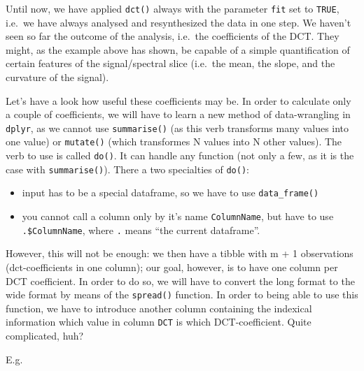 \documentclass[]{book}
\newenvironment{Shaded}{\begin{snugshade}}{\end{snugshade}}
\newcommand{\CommentTok}[1]{\textcolor[rgb]{0.56,0.35,0.01}{\textit{#1}}}
\newcommand{\DataTypeTok}[1]{\textcolor[rgb]{0.13,0.29,0.53}{#1}}
\newcommand{\DecValTok}[1]{\textcolor[rgb]{0.00,0.00,0.81}{#1}}
\newcommand{\KeywordTok}[1]{\textcolor[rgb]{0.13,0.29,0.53}{\textbf{#1}}}
\newcommand{\NormalTok}[1]{#1}
\newcommand{\OperatorTok}[1]{\textcolor[rgb]{0.81,0.36,0.00}{\textbf{#1}}}
\newcommand{\StringTok}[1]{\textcolor[rgb]{0.31,0.60,0.02}{#1}}
\providecommand{\tightlist}{%
  \setlength{\itemsep}{0pt}\setlength{\parskip}{0pt}}
\begin{document}
Until now, we have applied \texttt{dct()} always with the parameter \texttt{fit} set to \texttt{TRUE}, i.e.~we have always analysed and resynthesized the data in one step. We haven't seen so far the outcome of the analysis, i.e.~the coefficients of the DCT. They might, as the example above has shown, be capable of a simple quantification of certain features of the signal/spectral slice (i.e.~the mean, the slope, and the curvature of the signal).

Let's have a look how useful these coefficients may be. In order to calculate only a couple of coefficients, we will have to learn a new method of data-wrangling in \texttt{dplyr}, as we cannot use \texttt{summarise()} (as this verb transforms many values into one value) or \texttt{mutate()} (which transformes N values into N other values). The verb to use is called \texttt{do()}. It can handle any function (not only a few, as it is the case with \texttt{summarise()}). There a two specialties of \texttt{do()}:

\begin{itemize}
\tightlist
\item
  input has to be a special dataframe, so we have to use \texttt{data\_frame()}
\item
  you cannot call a column only by it's name \texttt{ColumnName}, but have to use \texttt{.\$ColumnName}, where \texttt{.} means ``the current dataframe''.
\end{itemize}

However, this will not be enough: we then have a tibble with m + 1 observations (dct-coefficients in one column); our goal, however, is to have one column per DCT coefficient. In order to do so, we will have to convert the long format to the wide format by means of the \texttt{spread()} function. In order to being able to use this function, we have to introduce another column containing the indexical information which value in column \texttt{DCT} is which DCT-coefficient. Quite complicated, huh?

E.g.

\begin{Shaded}
\end{Shaded}
\end{document}
